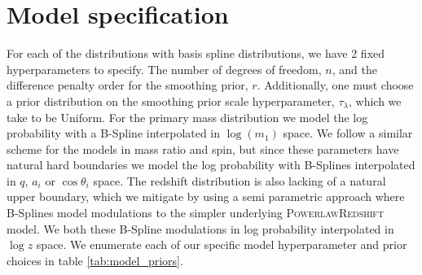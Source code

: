 \section{Model specification} \label{sec:modelpriors}

For each of the distributions with basis spline distributions, we have 2 fixed hyperparameters to specify. The number of degrees of freedom, $n$, and the difference 
penalty order for the smoothing prior, $r$. Additionally, one must choose a prior distribution on the smoothing prior scale hyperparameter, $\tau_\lambda$, which we take to be Uniform. 
For the primary mass distribution we model the log probability with a B-Spline interpolated in $\log(m_1)$ space. We follow a similar scheme for the models in mass ratio and spin, but since 
these parameters have natural hard boundaries we model the log probability with B-Splines interpolated in $q$, $a_i$ or $\cos{\theta_i}$ space. The 
redshift distribution is also lacking of a natural upper boundary, which we mitigate by using a semi parametric approach where B-Splines model modulations to the 
simpler underlying \textsc{PowerlawRedshift} model. We both these B-Spline modulations in log probability interpolated in $\log z$ space. We enumerate each of our specific model hyperparameter 
and prior choices in table \ref{tab:model_priors}.